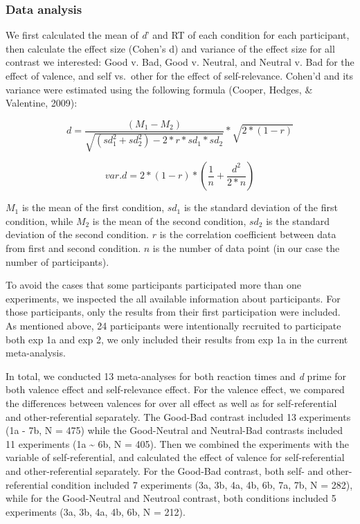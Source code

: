 \documentclass[man]{apa6}
\begin{document}
\hypertarget{data-analysis-8}{%
\subsubsection{Data analysis}\label{data-analysis-8}}

We first calculated the mean of \emph{d}' and RT of each condition for each participant, then calculate the effect size (Cohen's d) and variance of the effect size for all contrast we interested: Good v. Bad, Good v. Neutral, and Neutral v. Bad for the effect of valence, and self vs.~other for the effect of self-relevance. Cohen'd and its variance were estimated using the following formula (Cooper, Hedges, \& Valentine, 2009):

\[d = \frac {(M_{1} - M_{2})}{\sqrt {(sd_{1}^2 + sd_{2}^2) - 2*r*sd_{1}*sd_{2}}} * \sqrt {2*(1-r)}\]

\[var.d = 2*(1-r) * (\frac{1}{n} + \frac{d^2}{2*n})\]

\(M_1\) is the mean of the first condition, \(sd_1\) is the standard deviation of the first condition, while \(M_2\) is the mean of the second condition, \(sd_2\) is the standard deviation of the second condition. \(r\) is the correlation coefficient between data from first and second condition. \(n\) is the number of data point (in our case the number of participants).

To avoid the cases that some participants participated more than one experiments, we inspected the all available information about participants. For those participants, only the results from their first participation were included. As mentioned above, 24 participants were intentionally recruited to participate both exp 1a and exp 2, we only included their results from exp 1a in the current meta-analysis.

In total, we conducted 13 meta-analyses for both reaction times and \emph{d} prime for both valence effect and self-relevance effect. For the valence effect, we compared the differences between valences for over all effect as well as for self-referential and other-referential separately. The Good-Bad contrast included 13 experiments (1a - 7b, N = 475) while the Good-Neutral and Neutral-Bad contrasts included 11 experiments (1a \textasciitilde{} 6b, N = 405). Then we combined the experiments with the variable of self-referential, and calculated the effect of valence for self-referential and other-referential separately. For the Good-Bad contrast, both self- and other-referential condition included 7 experiments (3a, 3b, 4a, 4b, 6b, 7a, 7b, N = 282), while for the Good-Neutral and Neutroal contrast, both conditions included 5 experiments (3a, 3b, 4a, 4b, 6b, N = 212).
\end{document}
